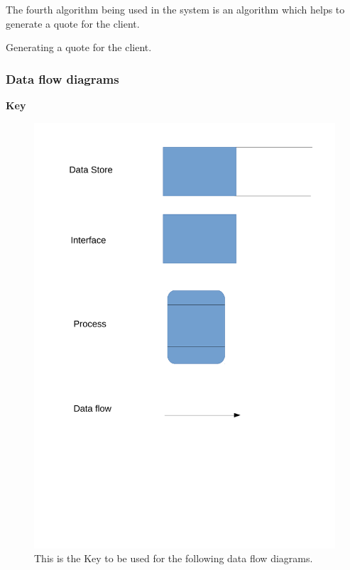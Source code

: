 The fourth algorithm being used in the system is an algorithm which helps to generate a quote for the client.

\begin{algorithm}[H]
	\label{fig:algorithm_quote}
		\caption{Generating a quote for the client.}
	\begin{algorithmic}[1]
		


	\end{algorithmic}
\end{algorithm}




\pagebreak
\subsubsection{Data flow diagrams}

\textbf{Key}
\begin{figure}[H]
\includegraphics[scale=0.5]{./Analysis/images/key.pdf}
    \caption{This is the Key to be used for the following data flow diagrams.} \label{fig:data_flow_diagram_key}
\end{figure}

